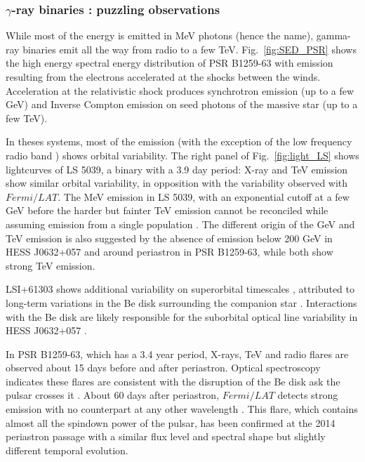 



\subsubsection {$\gamma$-ray binaries : puzzling observations}
While most of the energy is emitted in MeV photons (hence the name), gamma-ray binaries emit all the way from radio to a few TeV. Fig.~\ref{fig:SED_PSR} shows the high energy spectral energy distribution of PSR B1259-63 with emission resulting from the electrons accelerated at the shocks between the winds. Acceleration at the relativistic shock produces synchrotron emission (up to a few GeV) and Inverse Compton emission on seed photons of the massive star (up to a few TeV).   


In theses systems, most of the emission (with the exception of the low frequency radio band \citep{2015MNRAS.451...59M}) shows orbital variability. The right panel of  Fig.~\ref{fig:light_LS} shows lightcurves of LS 5039, a binary with a 3.9 day period:  X-ray and TeV emission show similar orbital variability, in opposition with the variability observed with $Fermi/LAT$.  The MeV emission in LS 5039, with an exponential cutoff at a few GeV before the harder but fainter TeV emission cannot be reconciled while assuming emission from a single population \citep{2008A&A...477..691D}. The different origin of the GeV and TeV emission is also suggested by the absence of emission below 200 GeV  in HESS J0632+057  \citep{2016arXiv160108216M} and around periastron in PSR B1259-63, while both show strong TeV emission.  

 LSI+61303 shows additional variability on superorbital timescales \citep{2012ApJ...747L..29C}, attributed to long-term variations in the Be disk surrounding the companion star \citep{2015A&A...575L...6P}. Interactions with the Be disk are likely responsible for the suborbital optical line variability in HESS J0632+057 \citep{2015ApJ...804L..32M}. 

In PSR B1259-63, which has a 3.4 year period, X-rays, TeV and radio flares are observed about 15 days before and after periastron. Optical spectroscopy indicates these flares are consistent with the disruption of the Be disk ask the pulsar crosses it \citep{2016MNRAS.455.3674V}.  About 60 days after periastron, $Fermi/LAT$ detects strong emission with no counterpart at any other wavelength \citep{2011ApJ...736L..11A}.  This flare, which contains almost all the spindown power of the pulsar,  has been confirmed at the 2014 periastron passage \citep{2015ApJ...811...68C} with a similar flux level and spectral shape but slightly different temporal evolution.  


